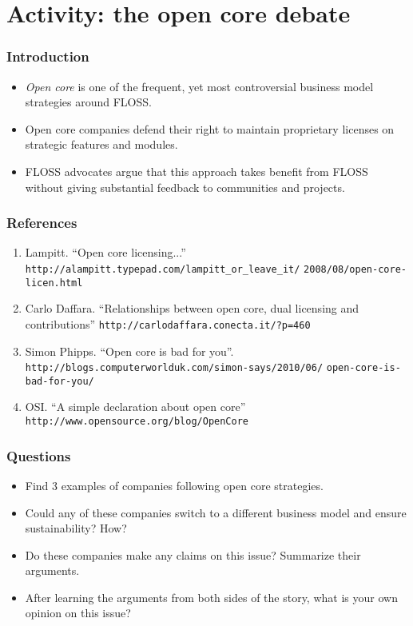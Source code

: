 
\section{Activity: the open core debate}

\begin{frame}
\frametitle{Introduction}
\begin{itemize}
  \item \textit{Open core} is one of the frequent, yet most controversial
business model strategies around FLOSS.
  \item Open core companies defend their right to maintain proprietary licenses
on strategic features and modules.
  \item FLOSS advocates argue that this approach takes benefit from FLOSS without
giving substantial feedback to communities and projects.
\end{itemize}
\end{frame}

\begin{frame}
 \frametitle{References}
  \begin{enumerate}
   \item Lampitt. ``Open core licensing...''
   \texttt{\footnotesize{http://alampitt.typepad.com/lampitt\_or\_leave\_it/}}
   \texttt{\footnotesize{2008/08/open-core-licen.html}}
   \item Carlo Daffara. ``Relationships between open core, dual licensing and contributions''
   \texttt{\footnotesize{http://carlodaffara.conecta.it/?p=460}}
   \item Simon Phipps. ``Open core is bad for you''.
   \texttt{\footnotesize{http://blogs.computerworlduk.com/simon-says/2010/06/}}
   \texttt{\footnotesize{open-core-is-bad-for-you/}}
   \item OSI. ``A simple declaration about open core''
   \texttt{\footnotesize{http://www.opensource.org/blog/OpenCore}}
  \end{enumerate}

\end{frame}

\begin{frame}
 \frametitle{Questions}
 \begin{itemize}
  \item Find 3 examples of companies following open core strategies.
  \item Could any of these companies switch to a different business model
  and ensure sustainability? How?
  \item Do these companies make any claims on this issue? Summarize
  their arguments.
  \item After learning the arguments from both sides of the story, what is your
  own opinion on this issue?
 \end{itemize}

\end{frame}



